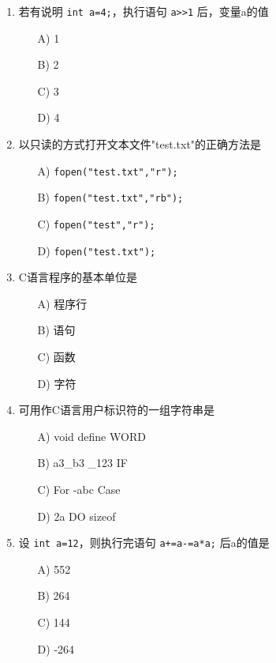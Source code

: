 \documentclass[a4paper,12pt]{article}
\begin{document}
\begin{enumerate}
	\item 若有说明 \texttt{int a=4;}，执行语句 \texttt{a>>1} 后，变量a的值
	      \begin{enumerate}
		      \item[A)] 1
		      \item[B)] 2
		      \item[C)] 3
		      \item[D)] 4
	      \end{enumerate}
	      \vspace{0.3cm}

	\item 以只读的方式打开文本文件"test.txt"的正确方法是
	      \begin{enumerate}
		      \item[A)] \texttt{fopen("test.txt","r");}
		      \item[B)] \texttt{fopen("test.txt","rb");}
		      \item[C)] \texttt{fopen("test","r");}
		      \item[D)] \texttt{fopen("test.txt");}
	      \end{enumerate}
	      \vspace{0.3cm}

	\item C语言程序的基本单位是
	      \begin{enumerate}
		      \item[A)] 程序行
		      \item[B)] 语句
		      \item[C)] 函数
		      \item[D)] 字符
	      \end{enumerate}
	      \vspace{0.3cm}

	\item 可用作C语言用户标识符的一组字符串是
	      \begin{enumerate}
		      \item[A)] void define WORD
		      \item[B)] a3\_b3 \_123 IF
		      \item[C)] For -abc Case
		      \item[D)] 2a DO sizeof
	      \end{enumerate}
	      \vspace{0.3cm}

	\item 设 \texttt{int a=12}，则执行完语句 \texttt{a+=a-=a*a;} 后a的值是
	      \begin{enumerate}
		      \item[A)] 552
		      \item[B)] 264
		      \item[C)] 144
		      \item[D)] -264
	      \end{enumerate}
	      \vspace{0.3cm}


\end{enumerate}
\end{document}
